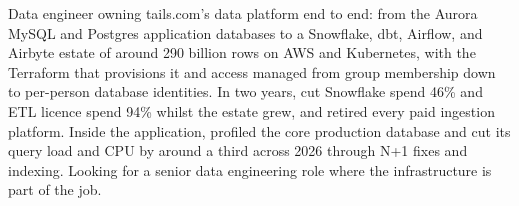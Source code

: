 \documentclass[10pt,a4paper,withhyper,ragged2e]{altacv}
\begin{document}
\makecvheader


Data engineer owning tails.com's data platform end to end: from the Aurora MySQL and Postgres
application databases to a Snowflake, dbt, Airflow, and Airbyte estate of around 290 billion rows
on AWS and Kubernetes, with the Terraform that provisions it and access managed from group
membership down to per-person database identities. In two years, cut Snowflake spend 46\% and ETL
licence spend 94\% whilst the estate grew, and retired every paid ingestion platform. Inside the
application, profiled the core production database and cut its query load and CPU by around a third
across 2026 through N+1 fixes and indexing. Looking for a senior data engineering role where the
infrastructure is part of the job.

\end{document}

